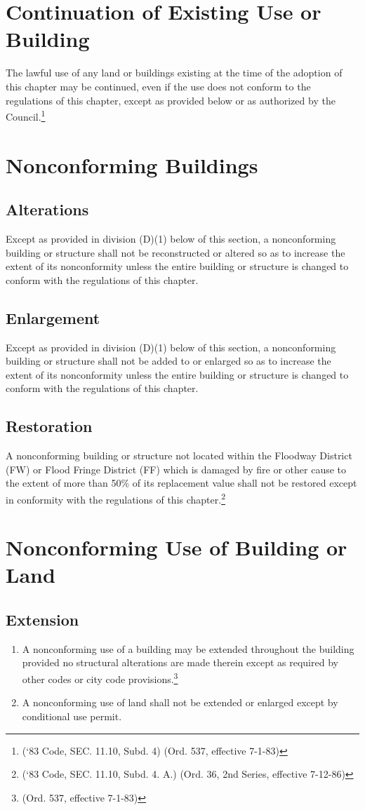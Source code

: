 
\setcounter{section}{114}
\section{Continuation of Existing Use or Building}
The lawful use of any land or buildings existing at the time of the adoption of this chapter may be continued, even if the use does not conform to the regulations of this chapter, except as provided below or as authorized by the Council.\footnote{(‘83 Code, SEC. 11.10, Subd. 4)  (Ord. 537, effective 7-1-83)}
\section{Nonconforming Buildings}
\subsection{Alterations}
Except as provided in division (D)(1) below of this section, a nonconforming building or structure shall not be reconstructed or altered so as to increase the extent of its nonconformity unless the entire building or structure is changed to conform with the regulations of this chapter.
\subsection{Enlargement}
Except as provided in division (D)(1) below of this section, a nonconforming building or structure shall not be added to or enlarged so as to increase the extent of its nonconformity unless the entire building or structure is changed to conform with the regulations of this chapter.
\subsection{Restoration}
A nonconforming building or structure not located within the Floodway District (FW) or Flood Fringe District (FF) which is damaged by fire or other cause to the extent of more than 50\% of its replacement value shall not be restored except in conformity with the regulations of this chapter.\footnote{(‘83 Code, SEC. 11.10, Subd. 4. A.)  (Ord. 36, 2nd Series, effective 7-12-86)}
\section{Nonconforming Use of Building or Land}
\subsection{Extension}
\begin{enumerate}[{\indent}1)]
    \item A nonconforming use of a building may be extended throughout the building provided no structural alterations are made therein except as required by other codes or city code provisions.\footnote{(Ord. 537, effective 7-1-83)}
    \item A nonconforming use of land shall not be extended or enlarged except by conditional use permit.
\end{enumerate}
